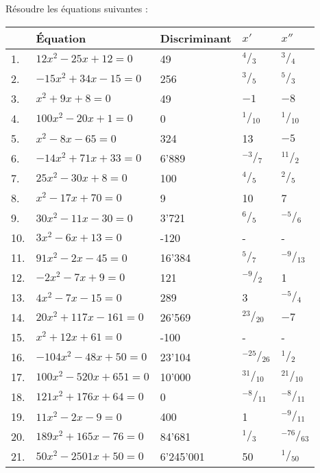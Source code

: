 \begin{solution}
Résoudre les équations suivantes :

\begin{tabular}{|l|l|l|l|l|}
\hline
	&Équation	&Discriminant &	${x}'$	&${x}''$\\
	\hline
1.	&$12{{x}^{2}}-25x+12=0$	&49&	${}^{4}/{}_{3}$	&${}^{3}/{}_{4}$\\
\hline
2.	&$-15{{x}^{2}}+34x-15=0$	&256&	${}^{3}/{}_{5}$	&${}^{5}/{}_{3}$\\
\hline
3.	&${{x}^{2}}+9x+8=0$	&49&	$-1$	&$-8$\\
\hline
4.	&$100{{x}^{2}}-20x+1=0$	&0&	${}^{1}/{}_{10}$	&${}^{1}/{}_{10}$\\
\hline
5.	&${{x}^{2}}-8x-65=0$	&324&	13	&$-5$\\
\hline
6.	&$-14{{x}^{2}}+71x+33=0$	&6'889&	${}^{-3}/{}_{7}$	&${}^{11}/{}_{2}$\\
\hline
7.	&$25{{x}^{2}}-30x+8=0$	&100&	${}^{4}/{}_{5}$	&${}^{2}/{}_{5}$\\
\hline
8.	&${{x}^{2}}-17x+70=0$	&9&	10	&7\\
\hline
9.	&$30{{x}^{2}}-11x-30=0$	&3'721&	${}^{6}/{}_{5}$	&${}^{-5}/{}_{6}$\\
\hline
10.	&$3{{x}^{2}}-6x+13=0$	&-120&	-	&-\\
\hline
11.	&$91{{x}^{2}}-2x-45=0$	&16'384&	${}^{5}/{}_{7}$	&${}^{-9}/{}_{13}$\\
\hline
12.	&$-2{{x}^{2}}-7x+9=0$	&121&	${}^{-9}/{}_{2}$	&1\\
\hline
13.	&$4{{x}^{2}}-7x-15=0$	&289&	3&	${}^{-5}/{}_{4}$\\
\hline
14.	&$20{{x}^{2}}+117x-161=0$	&26'569&	${}^{23}/{}_{20}$	&$-7$\\
\hline
15.	&${{x}^{2}}+12x+61=0$	&-100&	-	&-\\
\hline
16.	&$-104{{x}^{2}}-48x+50=0$	&23'104&	${}^{-25}/{}_{26}$	&${}^{1}/{}_{2}$\\
\hline
17.	&$100{{x}^{2}}-520x+651=0$	&10'000&	${}^{31}/{}_{10}$	&${}^{21}/{}_{10}$\\
\hline
18.	&$121{{x}^{2}}+176x+64=0$	&0&	${}^{-8}/{}_{11}$	&${}^{-8}/{}_{11}$\\
\hline
19.	&$11{{x}^{2}}-2x-9=0$	&400&	1	&${}^{-9}/{}_{11}$\\
\hline
20.	&$189{{x}^{2}}+165x-76=0$	&84'681&	${}^{1}/{}_{3}$	&${}^{-76}/{}_{63}$\\
\hline
21.	&$50{{x}^{2}}-2501x+50=0$	&6'245'001&	50	&${}^{1}/{}_{50}$\\
\hline
\end{tabular}
\end{solution}

